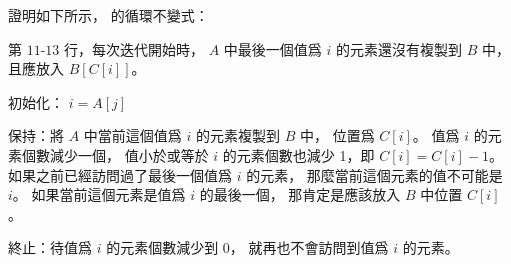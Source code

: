 \startEXERCISE
證明如下所示，  的循環不變式：

第 $11$-$13$ 行，每次迭代開始時，
 $A$ 中最後一個值爲 $i$ 的元素還沒有複製到 $B$ 中，
且應放入 $B[C[i]]$。
\stopEXERCISE

\startANSWER
初始化： $i=A[j]$

保持：將 $A$ 中當前這個值爲 $i$ 的元素複製到 $B$ 中，
位置爲 $C[i]$。
值爲 $i$ 的元素個數減少一個，
值小於或等於 $i$ 的元素個數也減少 1，即 $C[i]=C[i]-1$。
如果之前已經訪問過了最後一個值爲 $i$ 的元素，
那麼當前這個元素的值不可能是 $i$。
如果當前這個元素是值爲 $i$ 的最後一個，
那肯定是應該放入 $B$ 中位置 $C[i]$。

終止：待值爲 $i$ 的元素個數減少到 $0$，
就再也不會訪問到值爲 $i$ 的元素。
\stopANSWER
